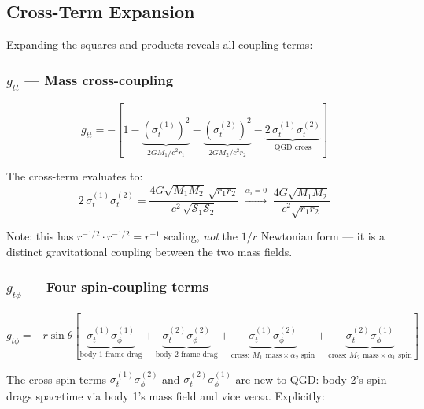 \documentclass[11pt,a4paper]{article}
\theoremstyle{definition}
\theoremstyle{remark}
\newcommand{\sig}[2]{\sigma_{#1}^{(#2)}}
\begin{document}
	\subsection{Cross-Term Expansion}
	
	Expanding the squares and products reveals all coupling terms:
	
	\subsubsection{$g_{tt}$ — Mass cross-coupling}
	
	\begin{equation}\label{eq:gtt_expanded}
		\boxed{
			g_{tt} = -\left[1
			- \underbrace{\left(\sig{t}{1}\right)^2}_{2GM_1/c^2r_1}
			- \underbrace{\left(\sig{t}{2}\right)^2}_{2GM_2/c^2r_2}
			- \underbrace{2\,\sig{t}{1}\sig{t}{2}}_{\text{QGD cross}}
			\right]
		}
	\end{equation}
	
	The cross-term evaluates to:
	\begin{equation}\label{eq:gtt_cross}
		2\,\sig{t}{1}\sig{t}{2}
		= \frac{4G\sqrt{M_1M_2}\,\sqrt{r_1 r_2}}{c^2\,\sqrt{\mathcal{S}_1\mathcal{S}_2}}
		\;\xrightarrow{\alpha_i=0}\;
		\frac{4G\sqrt{M_1M_2}}{c^2\sqrt{r_1 r_2}}
	\end{equation}
	
	Note: this has $r^{-1/2}\cdot r^{-1/2}=r^{-1}$ scaling,
	\emph{not} the $1/r$ Newtonian form — it is a distinct gravitational
	coupling between the two mass fields.
	
	\subsubsection{$g_{t\phi}$ — Four spin-coupling terms}
	
	\begin{equation}\label{eq:gtphi_expanded}
		g_{t\phi} = -r\sin\theta\left[
		\underbrace{\sig{t}{1}\sig{\phi}{1}}_{\text{body 1 frame-drag}}
		+\underbrace{\sig{t}{2}\sig{\phi}{2}}_{\text{body 2 frame-drag}}
		+\underbrace{\sig{t}{1}\sig{\phi}{2}}_{\text{cross: }M_1\text{ mass}\times\alpha_2\text{ spin}}
		+\underbrace{\sig{t}{2}\sig{\phi}{1}}_{\text{cross: }M_2\text{ mass}\times\alpha_1\text{ spin}}
		\right]
	\end{equation}
	
	The cross-spin terms $\sig{t}{1}\sig{\phi}{2}$ and $\sig{t}{2}\sig{\phi}{1}$
	are new to QGD: body 2's spin drags spacetime via body 1's mass field
	and vice versa. Explicitly:
	
\end{document}
